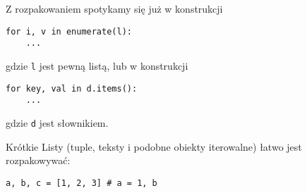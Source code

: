 Z rozpakowaniem spotykamy się już w konstrukcji

\begin{verbatim}
for i, v in enumerate(l):
    ...
\end{verbatim}

gdzie \verb|l| jest pewną listą, lub w konstrukcji

\begin{verbatim}
for key, val in d.items():
    ...
\end{verbatim}

gdzie \verb|d| jest słownikiem.


Krótkie Listy (tuple, teksty i podobne obiekty iterowalne) łatwo jest rozpakowywać:

\begin{verbatim}
a, b, c = [1, 2, 3] # a = 1, b
\end{verbatim}